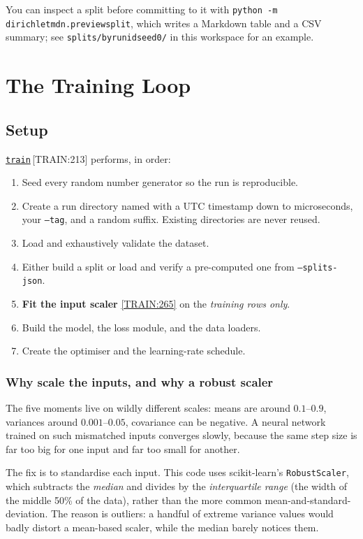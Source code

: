 \documentclass[11pt,a4paper]{report}
\newcommand{\srcbase}{vscode://file/Users/syellapa/Documents/Research/2026/ANSYS/Multi-ScalarPDF}
\newcommand{\dmdn}{dirichlet\string_mdn}
\newcommand{\srctag}[1]{{\footnotesize\textcolor{TagGray}{[#1]}}}
\newcommand{\Train}[2]{\href{\srcbase/\dmdn/train.py:#1}{\texttt{#2}}\,\srctag{TRAIN:#1}}
\newcommand{\TrainL}[1]{\href{\srcbase/\dmdn/train.py:#1}{\srctag{TRAIN:#1}}}
\newcommand{\code}[1]{\texttt{#1}}
\renewcommand{\_}{\origtextunderscore\allowbreak}
\begin{document}
You can inspect a split before committing to it with
\code{python -m dirichlet\_mdn.preview\_split}, which writes a Markdown table and a CSV
summary; see \code{splits/by\_run\_id\_seed0/} in this workspace for an example.

\chapter{The Training Loop}

\section{Setup}

\Train{213}{train} performs, in order:

\begin{enumerate}
  \item Seed every random number generator so the run is reproducible.
  \item Create a run directory named with a UTC timestamp down to microseconds, your
        \code{--tag}, and a random suffix. Existing directories are never reused.
  \item Load and exhaustively validate the dataset.
  \item Either build a split or load and verify a pre-computed one from
        \code{--splits-json}.
  \item \textbf{Fit the input scaler} \TrainL{265} on the \emph{training rows only}.
  \item Build the model, the loss module, and the data loaders.
  \item Create the optimiser and the learning-rate schedule.
\end{enumerate}

\subsection*{Why scale the inputs, and why a robust scaler}

The five moments live on wildly different scales: means are around $0.1$--$0.9$, variances
around $0.001$--$0.05$, covariance can be negative. A neural network trained on such
mismatched inputs converges slowly, because the same step size is far too big for one input
and far too small for another.

The fix is to standardise each input. This code uses scikit-learn's \code{RobustScaler}, which
subtracts the \emph{median} and divides by the \emph{interquartile range} (the width of the
middle 50\% of the data), rather than the more common mean-and-standard-deviation. The reason
is outliers: a handful of extreme variance values would badly distort a mean-based scaler,
while the median barely notices them.
\end{document}
